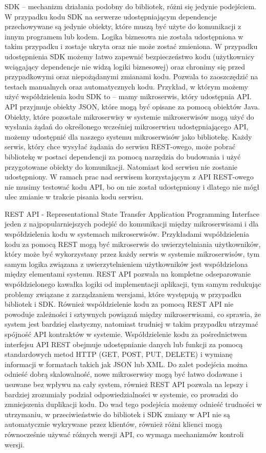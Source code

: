 \documentclass[runningheads,12pt]{llncs} \usepackage{graphicx} \usepackage{todonotes} \usepackage{fancyhdr} \usepackage{lipsum} \usepackage[T1]{fontenc} \usepackage[provide=*,english,polish]{babel}
\begin{document}
SDK – mechanizm działania podobny do bibliotek, różni się jedynie podejściem. W przypadku kodu SDK na serwerze udostępniającym dependencje przechowywane są jedynie obiekty, które muszą być użyte do komunikacji z innym programem lub kodem. Logika biznesowa nie została udostępniona w takim przypadku i zostaje ukryta oraz nie może zostać zmieniona. W przypadku udostępnienia SDK możemy łatwo zapewnić bezpieczeństwo kodu (użytkownicy wciągający dependencje nie widzą logiki biznesowej) oraz chronimy się przed przypadkowymi oraz niepożądanymi zmianami kodu. Pozwala to zaoszczędzić na testach manualnych oraz automatycznych kodu. Przykład, w którym możemy użyć współdzielenia kodu SDK to – mamy mikroserwis, który udostępnia API. API przyjmuje obiekty JSON, które mogą być opisane za pomocą obiektów Java. Obiekty, które pozostałe mikroserwisy w systemie mikroserwisów mogą użyć do wysłania żądań do określonego wcześniej mikroserwisu udostępniającego API, możemy udostępnić dla naszego systemu mikroserwisów jako bibliotekę. Każdy serwis, który chce wysyłać żądania do serwisu REST-owego, może pobrać bibliotekę w postaci dependencji za pomocą narzędzia do budowania i użyć przygotowane obiekty do komunikacji. Natomiast kod serwisu nie zostanie udostępniony. W ramach prac nad serwisem korzystającym z API REST-owego nie musimy testować kodu API, bo on nie został udostępniony i dlatego nie mógł ulec zmianie w trakcie pisania kodu serwisu.

REST API - Representational State Transfer Application Programming Interface jeden z najpopularniejszych podejść do komunikacji między mikroserwisami i dla współdzielenia kodu w systemach mikroserwisów. Przykładami współdzielenia kodu za pomocą REST mogą być mikroserwis do uwierzytelniania użytkowników, który może być wykorzystany przez każdy serwis w systemie mikroserwisów, tym samym logika związana z uwierzytelnieniem użytkowników jest współdzielona między elementami systemu. REST API pozwala na kompletne odseparowanie współdzielonego kawałka logiki od implementacji aplikacji, tym samym redukując problemy związane z zarządzaniem wersjami, które występują w przypadku bibliotek i SDK. Również współdzielenie kodu za pomocą REST API nie powoduje zależności i sztywnych powiązań między mikroserwisami, co sprawia, że system jest bardziej elastyczny, natomiast trudniej w takim przypadku utrzymać spójność API kontraktów w systemie. Współdzielenie kodu za pośrednictwem interfejsu API REST obejmuje udostępnianie danych lub funkcji za pomocą standardowych metod HTTP (GET, POST, PUT, DELETE) i wymianę informacji w formatach takich jak JSON lub XML. Do zalet podejścia można odnieść dobrą skalowalność, nowe mikroserwisy mogą być łatwo dodawane i usuwane bez wpływu na cały system, również REST API pozwala na lepszy i bardziej zrozumiały podział odpowiedzialności w systemie, co prowadzi do zmniejszenia duplikacji kodu. Do wad tego podejścia możemy odnieść trudności w utrzymaniu, w przeciwieństwie do bibliotek i SDK zmiany w API nie są automatycznie wykrywane przez klientów, również różni klienci mogą równocześnie używać różnych wersji API, co wymaga mechanizmów kontroli wersji.
\end{document}
